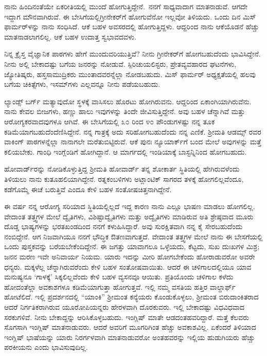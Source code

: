 ನಾನು ಹಿಂದಿನಂತೆಯೇ ಏಕರೀತಿಯಲ್ಲಿ ಮುಂದೆ ಹೋಗುತ್ತಿದ್ದೇನೆ.~ನನಗೆ ಸಾಧ್ಯವಾದಾಗ ಮಾತನಾಡುವೆ. ಆಗದೇ ಇದ್ದಾಗ ಮೌನವಾಗಿರುವೆ. ಈ ಬೇಸಿಗೆಯಲ್ಲಿ\break ಗ್ರೀನೇಕರ್‌ಗೆ ಹೋಗುವೆನೋ ಇಲ್ಲವೋ ತಿಳಿಯದು. ಒಂದು ದಿನ ಮಿಸ್ ಫಾರ್ಮರ್‌ಳನ್ನು ನಾನು ಸಂಧಿಸಿದೆ. ಆಕೆ ಬಹಳ ಅವಸರದಲ್ಲಿ ಹೋಗುತ್ತಿದ್ದಳು. ಆದ್ದರಿಂದ ನಾನು ಆಕೆಯೊಡನೆ ಹೆಚ್ಚು ಮಾತನಾಡಲಾಗಲಿಲ್ಲ. ಆಕೆ ಬಹಳ ಉದಾತ್ತ ಸ್ವಭಾವದವಳು.

ನಿನ್ನ ಕ್ರೈಸ್ತ ವೈಜ್ಞಾನಿಕ ಪಾಠಗಳು ಹೇಗೆ ಮುಂದುವರಿಯುತ್ತಿವೆ? ನೀನು ಗ್ರೀನೇಕರ್‌ಗೆ ಹೋಗಬಹುದೆಂದು ಭಾವಿಸಿದ್ದೇನೆ. ನೀನು ಅಲ್ಲಿ ಬೇಕಾದಷ್ಟು ಬಗೆಯ ಜನರನ್ನು ನೋಡುವೆ. ಸ್ಪಿರಿಚುಯಲಿಸ್ಟರು, ಪ್ರೇತವ್ಯವಹಾರದ ಘಟನೆಗಳು, ಜ್ಯೋತಿಷ್ಕರು, ಹಸ್ತ\break ಸಾಮುದ್ರಿಕರು ಮುಂತಾದವರನ್ನೆಲ್ಲಾ ನೋಡಬಹುದು. ಮಿಸ್‌ ಫಾರ್ಮರ್‌ ಅಧ್ಯಕ್ಷತೆಯಲ್ಲಿ ಹಲವು ಬಗೆಯ ಚಿಕಿತ್ಸೆಗಳು, ಇಸಮ್‌ಗಳು ಎಲ್ಲವನ್ನೂ ನೀನು ಪಡೆಯಬಹುದು.

ಲ್ಯಾಂಡ್ಸ್ ಬರ್ಗ್ ಮತ್ಯಾವುದೋ ಸ್ಥಳಕ್ಕೆ ವಾಸಿಸಲು ಹೊರಟು ಹೋಗಿರುವನು. ಆದ್ದರಿಂದ ಏಕಾಂಗಿಯಾಗಿರುವೆನು. ನಾನು ಕೇವಲ ಬೀಜಗಳು, ಹಣ್ಣು ಹಾಲು ಇವುಗಳನ್ನು ತಿಂದೇ ಜೀವಿಸುತ್ತಿದ್ದೇನೆ. ಅವು ಬಹಳ ಚೆನ್ನಾಗಿವೆ ಮತ್ತು ಆರೋಗ್ಯಕರವಾದವುಗಳೂ ಆಗಿವೆ. ಈ ಬೇಸಿಗೆಯಲ್ಲಿ ೩೦ ರಿಂದ ೪೦ ಪೌಂಡುಗಳಷ್ಟು ನನ್ನ ತೂಕ ಕಡಿಮೆಯಾಗಬಹುದೆಂದೆಣಿಸಿದ್ದೇನೆ. ನನ್ನ ಗಾತ್ರಕ್ಕೆ ಅದು ಸರಿಹೋಗಬಹುದೆಂದು ನನ್ನ ಎಣಿಕೆ. ಶ‍್ರೀಮತಿ ಆಡಮ್ಸ್ ರವರ ವಾಕಿಂಗ್ ಪಾಠಗಳನ್ನೆಲ್ಲಾ ನಾನಾಗಲೇ ಮರೆತುಬಿಟ್ಟಿರುವೆ. ಆಕೆ ಪುನಃ ನ್ಯೂಯಾರ್ಕ್‌ಗೆ ಬಂದ ಮೇಲೆ ಅವುಗಳನ್ನು ಮತ್ತೆ ಕಲಿಯಬೇಕು. ಗಾಂಧಿ ಇಂಗ್ಲೆಂಡಿಗೆ ಹೋಗಿದ್ದಾನೆ. ಆ ಮಾರ್ಗದಲ್ಲಿ ಇಂಡಿಯಾಕ್ಕೆ ಬಾಸ್ಟನ್ನಿನಿಂದ ಹೋಗಬಹುದು.

ಹೋವಾರ್ಡ್‌ರನ್ನು ನೋಡಿಕೊಳ್ಳುತ್ತಿದ್ದ ಶ‍್ರೀಮತಿ ಹೋವಾರ್ಡ್ ತನ್ನ ಶೋಕಾರ್ತ ಸ್ಥಿತಿಯಲ್ಲಿ ಹೇಗಿರುವಳೆಂದು ತಿಳಿಯಲು ನಾನು ಕುತೂಹಲಿಯಾಗಿದ್ದೇನೆ. ರತ್ನಕಂಬಳಿಗಳು ಅಟ್ಲಾಂಟಿಕ್ ಸಾಗರದ ತಳಕ್ಕೆ ಹೋಗಲಿಲ್ಲವೆಂದೂ, ಕಡೆಗೊಮ್ಮೆ ಈಚೆ ಬರುತ್ತಿವೆ ಎಂದೂ ಕೇಳಿ ಬಹಳ ಸಂತೋಷಚಿತ್ತನಾಗಿದ್ದೇನೆ.

ಈ ವರ್ಷ ನನ್ನ ಆರೋಗ್ಯ ಸರಿಯಾದ ಸ್ಥಿತಿಯಲ್ಲಿಲ್ಲದೆ ಇದ್ದ ಕಾರಣ ನಾನು ಎಲ್ಲೂ ಭಾಷಣ ಮಾಡಲು ಹೋಗಲಿಲ್ಲ. ವೇದಾಂತ ತತ್ತ್ವಗಳ ಮೇಲೆ ದ್ವೈತಿಗಳು, ವಿಶಿಷ್ಟಾದ್ವೈತಿಗಳು ಮತ್ತು ಅದ್ವೈತಿಗಳು ಮಾಡಿರುವ ಅತಿ ಶ್ರೇಷ್ಠವಾದ ಮೂರು ದೊಡ್ಡ ಭಾಷ್ಯಗಳನ್ನು ಭರತಖಂಡದಿಂದ ನನಗೆ ಕಳುಹಿಸಿದ್ದಾರೆ. ಅವು ಸುರಕ್ಷಿತವಾಗಿ ನನ್ನ ಕೈ ಸೇರಬಹುದೆಂದು ನಂಬಿದ್ದೇನೆ. ಆಗ ನಿಜವಾಗಿಯೂ ನನಗೆ ಭೌದ್ಧಿಕ ಔತಣವಾಗುತ್ತದೆ. ವೇದಾಂತ ತತ್ತ್ವಗಳ ಮೇಲೆ ನಾನು ಈ ಬೇಸಗೆಯಲ್ಲಿ ಒಂದು ಪುಸ್ತಕವನ್ನು ಬರೆಯಬೇಕೆಂದಿದ್ದೇನೆ. ಈ ಜಗತ್ತು ಯಾವಾಗಲೂ ಒಳ್ಳೆಯದು, ಕೆಟ್ಟದು, ಸುಖ ದುಃಖಗಳ ಮಿಶ್ರ; ಜನನ ಮರಣ ಇವೇ ಅನಿವಾರ್ಯ ನಿಯಮ. ಯಾರು ಇದನ್ನು ಮೀರಿ ಹೋಗಬೇಕೆಂದು ಹೋರಾಡುವರೋ ಅವರೇ ಧನ್ಯರು. ಮಕ್ಕಳೆಲ್ಲ ಚೆನ್ನಾಗಿರುವರೆಂದು ಕೇಳಿ ಬಹಳ ಸಂತೋಷವಾಯಿತು. ಆದರೆ ಈ ಚಳಿಗಾಲದಲ್ಲಿಯೂ ಯಾವ ಮನುಷ್ಯನೂ ‘ಗಾಳಕ್ಕೆ’ ಸಿಕ್ಕಲಿಲ್ಲವೆಂದು ಕೇಳಿ ಬಹಳ ವ್ಯಸನವೂ ಆಯಿತು. ಪ್ರತಿಯೊಂದು ಚಳಿಗಾಲ ಕಳೆದು ಹೋದಂತೆಲ್ಲಾ ಅವಕಾಶಗಳೂ ಕಡಿಮೆಯಾಗುತ್ತಾ ಹೋಗುತ್ತವೆ. ಇಲ್ಲಿ ನಮ್ಮ ವಸತಿಯ ಹತ್ತಿರ ವಾಲ್ದಾರ್ಫ್ ಹೋಟೆಲಿದೆ. ಇಲ್ಲಿ ಪ್ರದರ್ಶನದಲ್ಲಿ “ಯಾಂಕಿ” ಶ‍್ರೀಮಂತ ಕನ್ಯೆಯರು ಕೊಂಡುಕೊಳ್ಳಲು, ಶ‍್ರೀಮಂತ ಬಿರುದಾಂಕಿತರಾದ ಆದರೆ ನಿರ್ಗತಿಕರಾಗಿರುವ ಯೂರೋಪಿಯನ್ನರು ಹೇರಳವಾಗಿ ದೊರಕುವರು. ಇಲ್ಲಿ ಬೇಕಾದಷ್ಟು ವಿಧವಿಧವಾದ ಸರಕುಗಳಿವೆ. ನೀನು ಬೇಕಾದ್ದನ್ನು ಆರಿಸಿಕೊಳ್ಳಬಹುದು. ಇಂಗ್ಲಿಷ್ ಮಾತೇ ಆಡದಂತಹವರಿದ್ದಾರೆ. ಮತ್ತೆ ಕೆಲವರು ಸೊಗಸಾಗಿ ಇಂಗ್ಲಿಷ್ ಮಾತನಾಡುವರು. ಆದರೆ ಅವರಿಗೆ ಮೂಗರಿಗಿಂತ ಹೆಚ್ಚು ಅವಕಾಶವಿಲ್ಲ. ಏಕೆಂದರೆ ತಿಳಿಯಾದ ಇಂಗ್ಲಿಷ್ ಭಾಷೆಯನ್ನು ಯಾರು ನಿರರ್ಗಳವಾಗಿ ಮಾತನಾಡುವರೋ ಅಂತಹವರನ್ನು ಇಲ್ಲಿಯ ಹುಡುಗಿಯರು ಹೆಚ್ಚು ಪರಕೀಯನು ಎಂದು ಭಾವಿಸುವುದಿಲ್ಲ.

